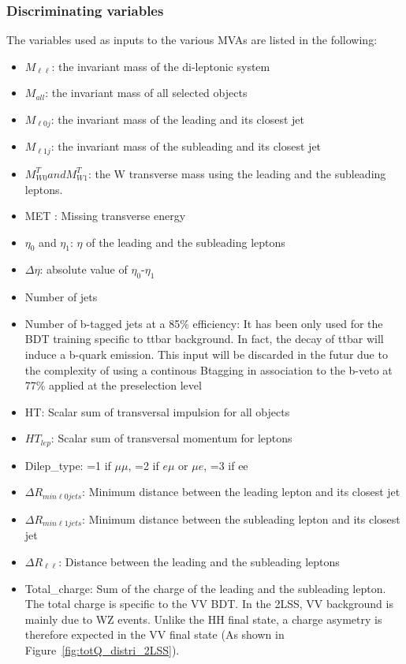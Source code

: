 \subsubsection{Discriminating variables}
The variables used as inputs to the various MVAs are listed in the following:
\begin{itemize}
    \item $M_{\ell \ell}$: the invariant mass of the di-leptonic system
    \item $M_{all}$: the invariant mass of all selected objects
    \item $M_{\ell0 j}$: the invariant mass of the leading and its closest jet
    \item $M_{\ell1 j}$: the invariant mass of the subleading and its closest jet
    \item $M_{W0}^T and M_{W1}^T$: the W transverse mass using the
      leading and the subleading leptons.
    \item MET : Missing transverse energy 
    \item $\eta_0$ and $\eta_1$: $\eta$ of the leading and the subleading leptons
    \item $\Delta \eta$: absolute value of $\eta_0$-$\eta_1$
    \item Number of jets
    \item Number of b-tagged jets at a 85\% efficiency: It has
      been only used for the BDT training specific to ttbar
      background. In fact, the decay of ttbar will induce a b-quark
      emission. 
      This input will be discarded in the futur due to the complexity of
      using a continous Btagging in association to the b-veto at 77\%
      applied at the preselection level
    \item HT: Scalar sum of transversal impulsion for all objects
    \item $HT_{lep}$: Scalar sum of transversal momentum for leptons
    \item Dilep\_type: =1 if $\mu \mu$, =2 if $e\mu$ or $\mu e$, =3 if ee
    \item $\Delta R _{min \ell0 jets}$: Minimum distance between the leading lepton and its closest jet
    \item $\Delta R _{min \ell1 jets}$: Minimum distance between the subleading lepton and its closest jet
    \item $\Delta R _{\ell \ell}$: Distance between the leading and the subleading leptons
    \item Total\_charge: Sum of the charge of the leading and the
      subleading lepton. The total charge is specific to the VV
      BDT. In the 2LSS, VV background is mainly due to WZ events.
     Unlike the HH final state, a charge asymetry is therefore
     expected in the VV final state (As shown in
     Figure~\ref{fig:totQ_distri_2LSS}).  
\end{itemize}

